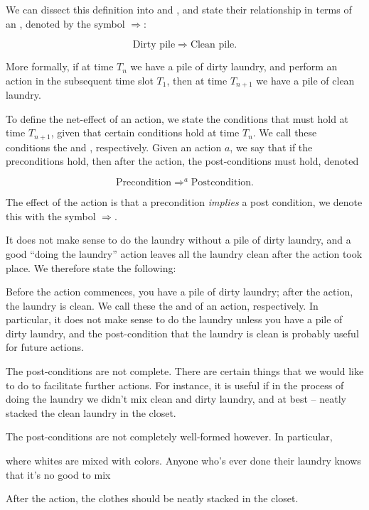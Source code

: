 We can dissect this definition into
 and , and state their relationship in
terms of an , denoted by the symbol $\Rightarrow$:

\begin{equation}
\text{Dirty pile}\Rightarrow \text{Clean pile}.
\end{equation}



More formally, if at time $T_n$ we
have a pile of dirty laundry, and perform an action in the subsequent time slot
$T_1$, then at time $T_{n+1}$ we have a pile of clean laundry.


To define the
net-effect of an action, we state the conditions that must hold at time
$T_{n+1}$, given that certain conditions hold at time $T_n$. We call these
conditions the  and , respectively. Given an
action $a$, we say that if the preconditions hold, then after the action, the
post-conditions must hold, denoted

\begin{equation}
\text{Precondition} \Rightarrow^a \text{Postcondition}.
\end{equation}


The effect
of the action is that a precondition \emph{implies} a post condition, we denote
this with the symbol $\Rightarrow$.

It does not make sense to do the laundry without a pile of dirty laundry, and a
good ``doing the laundry'' action leaves all the laundry clean after the action
took place. We therefore state the following:

 Before the action
commences, you have a pile of dirty laundry; after the action, the laundry is
clean. We call these the  and  of an action,
respectively. In particular, it does not make sense to do the laundry unless
you have a pile of dirty laundry, and the post-condition that the laundry is
clean is probably useful for future actions.

The post-conditions are not complete. There are certain things that we would
like to do to facilitate further actions. For instance, it is useful if in the
process of doing the laundry we didn't mix clean and dirty laundry, and at best
-- neatly stacked the clean laundry in the closet.


The post-conditions are not
completely well-formed however. In particular, 

where whites are mixed with
colors. Anyone who's ever done their laundry knows that it's no good to mix 

After the action, the clothes should be neatly stacked in the closet. 

